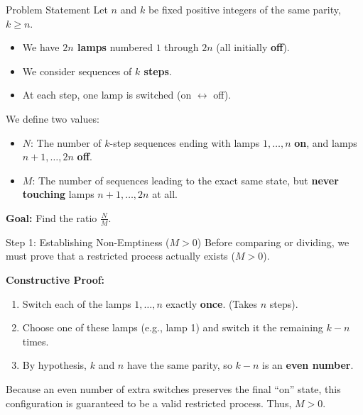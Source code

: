 \documentclass[10pt]{beamer}
\begin{document}
\begin{frame}{Problem Statement}
Let $n$ and $k$ be fixed positive integers of the same parity, $k \ge n$.
\begin{itemize}
    \item We have \textbf{$2n$ lamps} numbered $1$ through $2n$ (all initially \textbf{off}).
    \item We consider sequences of \textbf{$k$ steps}.
    \item At each step, one lamp is switched (on $\leftrightarrow$ off).
\end{itemize}

\vspace{0.3cm}
We define two values:
\begin{itemize}
    \item \textbf{$N$}: The number of $k$-step sequences ending with lamps $1, \dots, n$ \textbf{on}, and lamps $n+1, \dots, 2n$ \textbf{off}.
    \item \textbf{$M$}: The number of sequences leading to the exact same state, but \textbf{never touching} lamps $n+1, \dots, 2n$ at all.
\end{itemize}

\vspace{0.3cm}
\alert{\textbf{Goal:}} Find the ratio $\frac{N}{M}$.
\end{frame}

\begin{frame}{Step 1: Establishing Non-Emptiness ($M > 0$)}
Before comparing or dividing, we must prove that a restricted process actually exists ($M > 0$).

\vspace{0.4cm}
\textbf{Constructive Proof:}
\begin{enumerate}
    \item Switch each of the lamps $1, \dots, n$ exactly \textbf{once}. (Takes $n$ steps).
    \item Choose one of these lamps (e.g., lamp 1) and switch it the remaining $k - n$ times.
    \item By hypothesis, $k$ and $n$ have the same parity, so $k - n$ is an \textbf{even number}.
\end{enumerate}

\vspace{0.3cm}
Because an even number of extra switches preserves the final ``on'' state, this configuration is guaranteed to be a valid restricted process. Thus, $M > 0$.
\end{frame}
\end{document}
